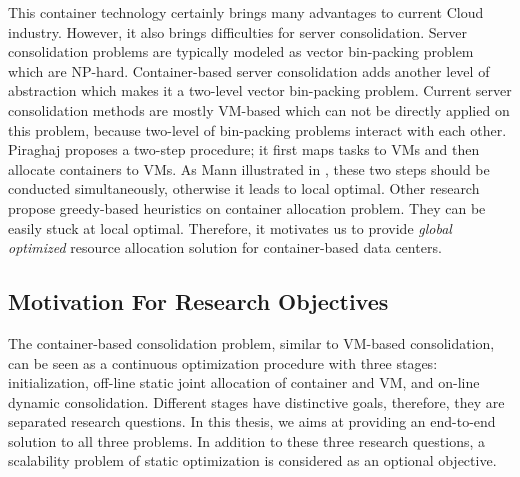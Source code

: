 
This container technology certainly brings many advantages to current Cloud industry\cite{Felter:2015ki}. However, it also brings difficulties for server consolidation. Server consolidation problems are typically modeled as vector bin-packing problem which are NP-hard. Container-based server consolidation adds another level of abstraction which makes it a two-level vector bin-packing problem. Current server consolidation methods are mostly VM-based which can not be directly applied on this problem, because two-level of bin-packing problems interact with each other. Piraghaj \cite{Piraghaj:2016bw} proposes a two-step procedure; it first maps tasks to VMs and then allocate containers to VMs. As Mann illustrated in \cite{Mann:2016hx},  these two steps should be conducted simultaneously, otherwise it leads to local optimal. Other research \cite{Dong:2014iz, Hindman:2011ux, Anselmi:2008ik} propose greedy-based heuristics on container allocation problem. They can be easily stuck at local optimal. 
Therefore, it motivates us to provide \emph{global optimized} resource allocation solution for container-based data centers.



\subsection{Motivation For Research Objectives}
The container-based consolidation problem, similar to VM-based consolidation, can be seen as 
a continuous optimization procedure with three stages: initialization, off-line static joint allocation of container and VM, and on-line dynamic consolidation. Different stages have distinctive goals, therefore, they are separated research questions. In this thesis, we aims at providing an end-to-end solution to all three problems. In addition to these three research questions, a scalability problem of static optimization is considered as an optional objective.

